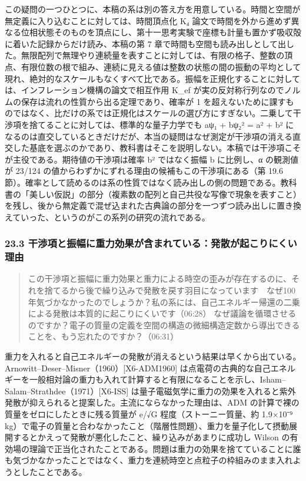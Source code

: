 \documentclass[
  a4paper,
]{ltjsarticle}
\begin{document}
この疑問の一つひとつに、本稿の系は別の答え方を用意している。時間と空間が無定義に入り込むことに対しては、時間頂点化
K₄
論文で時間を外から進めず異なる位相状態そのものを頂点にし、第十一思考実験で座標も計量も置かず吸収殻に着いた記録からだけ読み、本稿の第
7
章で時間も空間も読み出しとして出した。無限配列で無理やり連続量を表すことに対しては、有限の格子、整数の頂点、有限位数の根で組み、連続に見える値は整数の状態の間の振動の平均として現れ、絶対的なスケールもなくすべて比である。振幅を正規化することに対しては、インフレーション機構の論文で相互作用
K\_ef
が実の反対称行列なのでノルムの保存は流れの性質から出る定理であり、確率が
1
を超えないために課すものではなく、比だけの系では正規化はスケールの選び方にすぎない。二乗して干渉項を捨てることに対しては、標準的な量子力学でも
\textbar aψ₁ + bψ₂\textbar² = \textbar a\textbar² + \textbar b\textbar²
になるのは直交しているときだけだが、本当の疑問はなぜ測定が干渉項の消える直交した基底を選ぶのかであり、教科書はそこを説明しない。本稿では干渉項こそが主役である。期待値の干渉項は確率
\textbar b\textbar² ではなく振幅 b に比例し、α の観測値が 23/124
の値からわずかにずれる理由の候補もこの干渉項にある（第 19.6
節）。確率として読めるのは系の性質ではなく読み出しの側の問題である。教科書の「美しい仮説」の部分（複素数の配列と自己共役な写像で現象を表すこと）を残し、後から無定義で混ぜ込まれた古典論の部分を一つずつ読み出しに置き換えていった、というのがこの系列の研究の流れである。

\subsubsection{23.3
干渉項と振幅に重力効果が含まれている：発散が起こりにくい理由}\label{ux5e72ux6e09ux9805ux3068ux632fux5e45ux306bux91cdux529bux52b9ux679cux304cux542bux307eux308cux3066ux3044ux308bux767aux6563ux304cux8d77ux3053ux308aux306bux304fux3044ux7406ux7531}

\begin{quote}
この干渉項と振幅に重力効果と重力による時空の歪みが存在するのに、それを捨てるから後で繰り込みで発散を戻す羽目になっています　なぜ100年気づかなかったのでしょうか？私の系には、自己エネルギー帰還の二乗による発散は本質的に起こりにくいです（06:28）
なぜ議論を循環させるのですか？電子の質量の定義を空間の構造の微細構造定数から導出できることを、もう忘れたのですか？（06:31）
\end{quote}

重力を入れると自己エネルギーの発散が消えるという結果は早くから出ている。Arnowitt--Deser--Misner（1960）{[}X6-ADM1960{]}
は点電荷の古典的な自己エネルギーを一般相対論の重力も入れて計算すると有限になることを示し、Isham--Salam--Strathdee（1971）{[}X6-ISS{]}
は量子電磁気学に重力の効果を入れると紫外発散が抑えられると提案した。主流にならなかった理由は、ADM
の計算で裸の質量をゼロにしたときに残る質量が e/√G
程度（ストーニー質量、約 1.9×10⁻⁹
kg）で電子の質量と合わなかったこと（階層性問題）、重力を量子化して摂動展開するとかえって発散が悪化したこと、繰り込みがあまりに成功し
Wilson
の有効場の理論で正当化されたことである。問題は重力の効果を捨てていることに誰も気づかなかったことではなく、重力を連続時空と点粒子の枠組みのまま入れようとしたことである。
\end{document}
